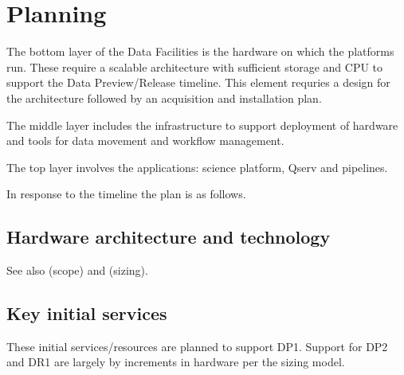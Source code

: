 \section{Planning}\label{sec:plan}

The bottom layer of the Data Facilities is the hardware on which the
platforms run. These require a scalable architecture with sufficient
storage and \gls{CPU} to support the Data Preview/Release timeline.  This
element requries a design for the architecture followed by an
acquisition and installation plan.

The middle layer includes the infrastructure to support deployment of
hardware and tools for data movement and workflow management.

 The top layer involves the applications: science platform, \gls{Qserv} and pipelines.

In response to the timeline  the plan is as follows.

\subsection {Hardware architecture and technology}
See also  (scope) and   (sizing).

\subsection{Key initial services}

These initial services/resources are planned to support \gls{DP1}. Support
for \gls{DP2} and DR1 are largely by increments in hardware per the sizing model.


